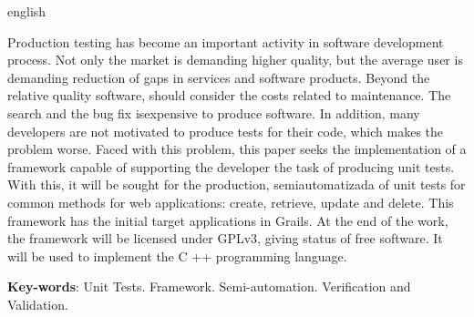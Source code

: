 \begin{resumo}[Abstract]
 \begin{otherlanguage*}{english}
  
Production testing has become an important activity in software development process. Not only the market is demanding higher quality, but the average user is demanding reduction of gaps in services and software products. Beyond the relative quality software, should consider the costs related to maintenance. The search and the bug fix is ​​expensive to produce software. In addition, many developers are not motivated to produce tests for their code, which makes the problem worse. Faced with this problem, this paper seeks the implementation of a framework capable of supporting the developer the task of producing unit tests. With this, it will be sought for the production, semiautomatizada of unit tests for common methods for web applications: create, retrieve, update and delete. This framework has the initial target applications in Grails. At the end of the work, the framework will be licensed under GPLv3, giving status of free software. It will be used to implement the C ++ programming language.

   \vspace{\onelineskip}
 
   \noindent 
   \textbf{Key-words}: Unit Tests. Framework. Semi-automation. Verification and Validation.
 \end{otherlanguage*}
\end{resumo}
